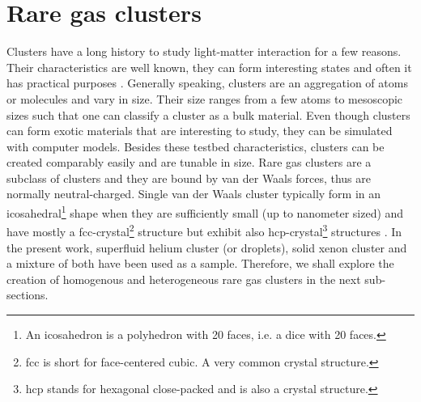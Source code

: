 \section{Rare gas clusters}\label{sec:cluster-theory}
Clusters have a long history to study light-matter interaction for a few reasons. Their characteristics are well known, they can form interesting states and often it has practical purposes \cite{Haberland-1994-Springer}. Generally speaking, clusters are an aggregation of atoms or molecules and vary in size. Their size ranges from a few atoms to mesoscopic sizes such that one can classify a cluster as a bulk material. Even though clusters can form exotic materials that are interesting to study, they can be simulated with computer models. Besides these testbed characteristics, clusters can be created comparably easily and are tunable in size. Rare gas clusters are a subclass of clusters and they are bound by van der Waals forces, thus are normally neutral-charged. Single van der Waals cluster typically form in an icosahedral\footnote{An icosahedron is a polyhedron with 20 faces, i.e. a dice with 20 faces.} shape when they are sufficiently small (up to nanometer sized) \cite{Miehle-1989-JCP} and have mostly a fcc-crystal\footnote{fcc is short for face-centered cubic. A very common crystal structure.} structure but exhibit also hcp-crystal\footnote{hcp stands for hexagonal close-packed and is also a crystal structure.} structures \cite{VanDeWaal-1993-JCP,Krainyukova-2006-TSF}. In the present work, superfluid helium cluster (or droplets), solid xenon cluster and a mixture of both have been used as a sample. Therefore, we shall explore the creation of homogenous and heterogeneous rare gas clusters in the next sub-sections.
%
%
%
